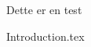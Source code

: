 \documentclass[12pt]{article}
\begin{document}
Dette er en test 

{Introduction.tex}
\end{document}
